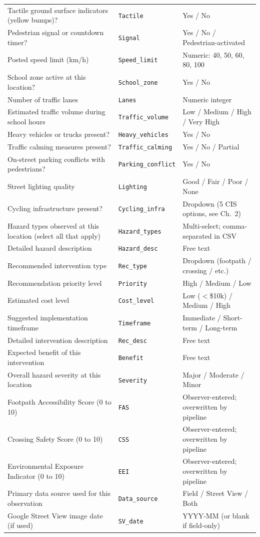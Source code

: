 \documentclass[11pt,a4paper,openany]{book}
\begin{document}
\begin{longtable}{L{5.8cm} L{3.2cm} L{4.5cm}}
Tactile ground surface indicators (yellow bumps)? & \texttt{Tactile} & Yes / No \\
Pedestrian signal or countdown timer? & \texttt{Signal} & Yes / No / Pedestrian-activated \\
Posted speed limit (km/h) & \texttt{Speed\_limit} & Numeric: 40, 50, 60, 80, 100 \\
School zone active at this location? & \texttt{School\_zone} & Yes / No \\
Number of traffic lanes & \texttt{Lanes} & Numeric integer \\
Estimated traffic volume during school hours & \texttt{Traffic\_volume} & Low / Medium / High / Very High \\
Heavy vehicles or trucks present? & \texttt{Heavy\_vehicles} & Yes / No \\
Traffic calming measures present? & \texttt{Traffic\_calming} & Yes / No / Partial \\
On-street parking conflicts with pedestrians? & \texttt{Parking\_conflict} & Yes / No \\
Street lighting quality & \texttt{Lighting} & Good / Fair / Poor / None \\
Cycling infrastructure present? & \texttt{Cycling\_infra} & Dropdown (5 CIS options, see Ch.~2) \\
Hazard types observed at this location (select all that apply) & \texttt{Hazard\_types} & Multi-select; comma-separated in CSV \\
Detailed hazard description & \texttt{Hazard\_desc} & Free text \\
Recommended intervention type & \texttt{Rec\_type} & Dropdown (footpath / crossing / etc.) \\
Recommendation priority level & \texttt{Priority} & High / Medium / Low \\
Estimated cost level & \texttt{Cost\_level} & Low ($<$\$10k) / Medium / High \\
Suggested implementation timeframe & \texttt{Timeframe} & Immediate / Short-term / Long-term \\
Detailed intervention description & \texttt{Rec\_desc} & Free text \\
Expected benefit of this intervention & \texttt{Benefit} & Free text \\
Overall hazard severity at this location & \texttt{Severity} & Major / Moderate / Minor \\
Footpath Accessibility Score (0 to 10) & \texttt{FAS} & Observer-entered; overwritten by pipeline \\
Crossing Safety Score (0 to 10) & \texttt{CSS} & Observer-entered; overwritten by pipeline \\
Environmental Exposure Indicator (0 to 10) & \texttt{EEI} & Observer-entered; overwritten by pipeline \\
Primary data source used for this observation & \texttt{Data\_source} & Field / Street View / Both \\
Google Street View image date (if used) & \texttt{SV\_date} & YYYY-MM (or blank if field-only) \\
\end{longtable}
\end{document}
